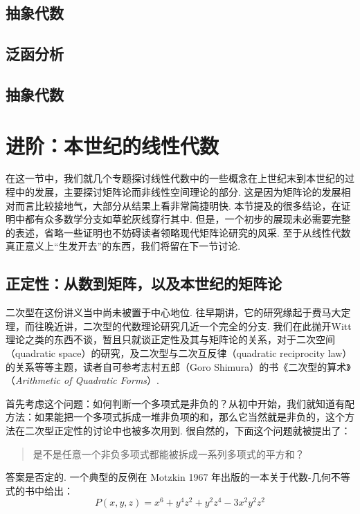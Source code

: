 \subsection{抽象代数}

\subsection{泛函分析}

\subsection{抽象代数}

\section{进阶：本世纪的线性代数}

在这一节中，我们就几个专题探讨线性代数中的一些概念在上世纪末到本世纪的过程中的发展，主要探讨矩阵论而非线性空间理论的部分. 这是因为矩阵论的发展相对而言比较接地气，大部分从结果上看非常简捷明快. 本节提及的很多结论，在证明中都有众多数学分支如草蛇灰线穿行其中. 但是，一个初步的展现未必需要完整的表述，省略一些证明也不妨碍读者领略现代矩阵论研究的风采. 至于从线性代数真正意义上``生发开去''的东西，我们将留在下一节讨论.

\subsection{正定性：从数到矩阵，以及本世纪的矩阵论}

二次型在这份讲义当中尚未被置于中心地位. 往早期讲，它的研究缘起于费马大定理，而往晚近讲，二次型的代数理论研究几近一个完全的分支. 我们在此抛开Witt理论之类的东西不谈，暂且只就谈正定性及其与矩阵论的关系，对于二次空间（quadratic space）的研究，及二次型与二次互反律（quadratic reciprocity law）的关系等等主题，读者自可参考志村五郎（Goro Shimura）的书《二次型的算术》（\textit{Arithmetic of Quadratic Forms}）.

首先考虑这个问题：如何判断一个多项式是非负的？从初中开始，我们就知道有配方法：如果能把一个多项式拆成一堆非负项的和，那么它当然就是非负的，这个方法在二次型正定性的讨论中也被多次用到. 很自然的，下面这个问题就被提出了：

\begin{quote}
    \kaishu
    是不是任意一个非负多项式都能被拆成一系列多项式的平方和？
\end{quote}

答案是否定的. 一个典型的反例在 Motzkin 1967 年出版的一本关于代数-几何不等式的书中给出：
\[ P(x, y, z) = x^6 + y^4z^2 + y^2z^4 -3x^2y^2z^2 \]

